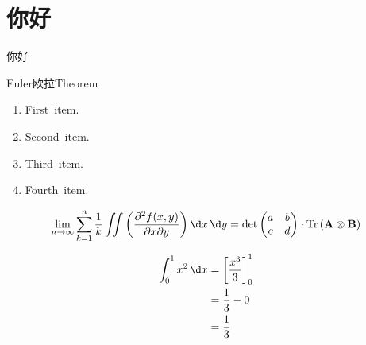 \documentclass[10pt]{mycls}
\begin{document}
\zhlipsum*[name=zhufu]


\chapter{你好}
你好
\zhlipsum*[1]
\begin{mybox}[colframe=cyan]{Euler欧拉Theorem}
    \begin{enumerate}
        \item First~item.
        \item Second~item.
        \item Third~item.
        \item Fourth~item.
    \end{enumerate}
    \zhlipsum*[3]
\end{mybox}

\[ 
\lim_{n \to \infty} \sum_{k=1}^{n} \frac{1}{k} \iint
\left( \frac{\partial^{2} f(x,y)}{\partial x \partial y} \right) \d x \, \d y 
= \det \begin{pmatrix} a & b \\ c & d \end{pmatrix} 
\cdot \operatorname{Tr} \left( \mathbf{A} \otimes \mathbf{B} \right)
\]

\zhlipsum*[1]
\begin{align}
\int_{0}^{1} x^{2} \, \d x 
&= \left[ \frac{x^{3}}{3} \right]_{0}^{1} \\
&= \frac{1}{3} - 0 \\
&= \frac{1}{3}
\end{align}

\zhlipsum*[name=zhufu]
\end{document}
